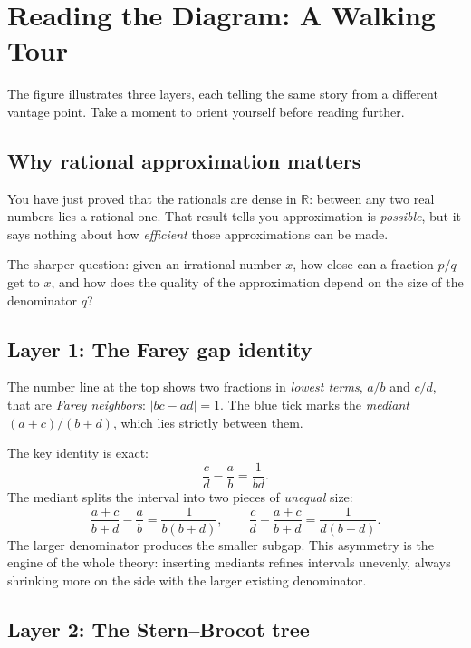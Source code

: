 
\newpage
\section*{Reading the Diagram: A Walking Tour}

The figure illustrates three layers, each telling the same story from a different vantage point.
Take a moment to orient yourself before reading further.

\subsection*{Why rational approximation matters}

You have just proved that the rationals are dense in $\mathbb{R}$: between any two real numbers lies a rational one. That result tells you approximation is \emph{possible}, but it says nothing about how \emph{efficient} those approximations can be made.

The sharper question: given an irrational number $x$, how close can a fraction $p/q$ get to $x$, and how does the quality of the approximation depend on the size of the denominator $q$? 

\subsection*{Layer 1: The Farey gap identity}

The number line at the top shows two fractions in \emph{lowest terms}, $a/b$ and $c/d$, that are \emph{Farey neighbors}: $|bc - ad| = 1$. The blue tick marks the \emph{mediant} $(a+c)/(b+d)$, which lies strictly between them.

The key identity is exact:
\[
\frac{c}{d} - \frac{a}{b} = \frac{1}{bd}.
\]
The mediant splits the interval into two pieces of \emph{unequal} size:
\[
\frac{a+c}{b+d} - \frac{a}{b} = \frac{1}{b(b+d)}, \qquad \frac{c}{d} - \frac{a+c}{b+d} = \frac{1}{d(b+d)}.
\]
The larger denominator produces the smaller subgap. This asymmetry is the engine of the whole theory: inserting mediants refines intervals unevenly, always shrinking more on the side with the larger existing denominator.

\subsection*{Layer 2: The Stern--Brocot tree}

